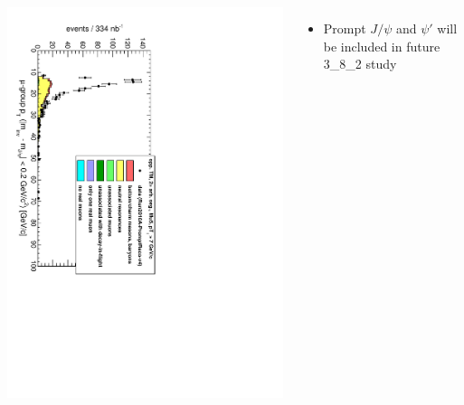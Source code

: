 \documentclass[compress]{beamer}
\begin{document}
\begin{frame}
\vspace{-6.7 cm}
\begin{columns}
\includegraphics[height=\linewidth, angle=90]{Mu5_pt_jpsi.pdf}
\vspace{0.3 cm}
\vspace{-2 cm}
\begin{itemize}
\item Prompt $J/\psi$ and $\psi'$ will be included in future 3\_8\_2 study
\end{itemize}
\end{columns}

\vspace{6 cm}
\end{frame}
\end{document}

